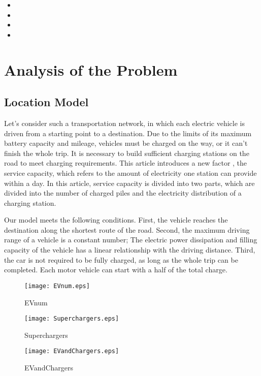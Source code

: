 \documentclass{mcmthesis}
\begin{document}
\begin{itemize}
\item
\item
\item
\item
\end{itemize}


\section{Analysis of the Problem}

\subsection {Location Model} 


      Let's consider such a transportation network, in which each electric vehicle is driven from a starting point to a destination. Due to the limits of its maximum battery capacity and mileage, vehicles must be charged on the way, or it can’t finish the whole trip. It is necessary to build sufficient charging stations on the road to meet charging requirements. This article introduces a new factor , the service capacity,  which refers to the amount of electricity one station can provide within a day.  In this article, service capacity is divided into two parts, which are divided into the number of charged piles and the electricity distribution of a charging station.

Our model meets the following conditions. First, the vehicle reaches the destination along the shortest route of the road. Second, the maximum driving range  of a vehicle is a constant number; The electric power dissipation and filling capacity of the vehicle has a linear relationship with the driving distance. Third, the car is not required to be fully charged, as long as the whole trip can be completed. Each motor vehicle can start with a half of the total charge.


\begin{figure}[h]
\small
\centering
\texttt{[image: EVnum.eps]}
\caption{EVnum} 
\end{figure}

\begin{figure}[h]
\small
\centering
\texttt{[image: Superchargers.eps]}
\caption{Superchargers} 
\end{figure}

\begin{figure}[h]
\small
\centering
\texttt{[image: EVandChargers.eps]}
\caption{EVandChargers} 
\end{figure}
\end{document}
